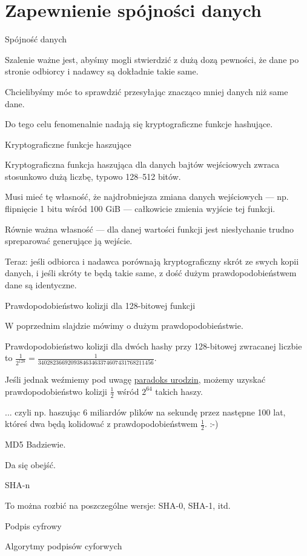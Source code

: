\section{Zapewnienie spójności danych}

\begin{frame}{Spójność danych}
	
	Szalenie ważne jest, abyśmy mogli stwierdzić z dużą dozą pewności, że dane po stronie odbiorcy i nadawcy są dokładnie takie same.
	
	Chcielibyśmy móc to sprawdzić przesyłając znacząco mniej danych niż same dane.
	
	Do tego celu fenomenalnie nadają się kryptograficzne funkcje hashujące.

\end{frame}

\begin{frame}{Kryptograficzne funkcje haszujące}
	
	Kryptograficzna funkcja haszująca dla danych bajtów wejściowych zwraca stosunkowo dużą liczbę, typowo 128--512 bitów.
	
	Musi mieć tę własność, że najdrobniejsza zmiana danych wejściowych --- np. flipnięcie 1 bitu wśród 100 GiB --- całkowicie zmienia wyjście tej funkcji.
	
	Równie ważna własność --- dla danej wartości funkcji jest niesłychanie trudno spreparować generujące ją wejście.
	
	Teraz: jeśli odbiorca i nadawca porównają kryptograficzny skrót ze swych kopii danych, i jeśli skróty te będą takie same, z dość dużym prawdopodobieństwem dane są identyczne.
	
\end{frame}

\begin{frame}{Prawdopodobieństwo kolizji dla 128-bitowej funkcji}
	
	W poprzednim slajdzie mówimy o dużym prawdopodobieństwie.
	
	Prawdopodobieństwo kolizji dla dwóch hashy przy 128-bitowej zwracanej liczbie to $\frac{1}{2^{128}}=\frac{1}{340282366920938463463374607431768211456}$.
	
	Jeśli jednak weźmiemy pod uwagę \href{http://en.wikipedia.org/wiki/Birthday_problem}{paradoks urodzin}, możemy uzyskać prawdopodobieństwo kolizji $\frac{1}{2}$ wśród $2^{64}$ takich haszy.
	
	... czyli np. haszując 6 miliardów plików na sekundę przez następne 100 lat, któreś dwa będą kolidować z prawdopodobieństwem $\frac{1}{2}$. :-)
	
\end{frame}

\begin{frame}{MD5}
	Badziewie.
	
	Da się obejść.
\end{frame}

\begin{frame}{SHA-n}
	
	To można rozbić na poszczególne wersje: SHA-0, SHA-1, itd.
\end{frame}


\begin{frame}{Podpis cyfrowy}
	
\end{frame}

\begin{frame}{Algorytmy podpisów cyforwych}
	
\end{frame}